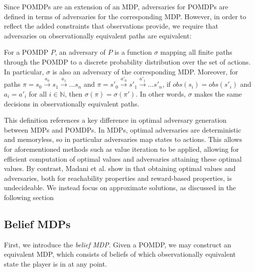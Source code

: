 Since POMDPs are an extension of an MDP, adversaries for POMDPs are defined in terms of adversaries for the corresponding MDP. However, in order to reflect the added constraints that observations provide, we require that adversaries on observationally equivalent paths are equivalent:

\begin{definition}
\label{cs1:pomdp_strats}

For a POMDP $P$, an adversary of $P$ is a function $\sigma$ mapping all finite paths through the POMDP to a discrete probability distribution over the set of actions. In particular, $\sigma$ is also an adversary of the corresponding MDP. Moreover, for paths $\pi = s_0 \xrightarrow{a_0} s_1 \xrightarrow{a_1} \dots s_n$ and $\pi = s'_0 \xrightarrow{a'_0} s'_1 \xrightarrow{a'_1} \dots s'_n$, if $obs(s_i) = obs(s'_i)$ and $a_i = a'_i$ for all $i \in \mathbb{N}$, then $\sigma(\pi) = \sigma(\pi')$. In other words, $\sigma$ makes the same decisions in observationally equivalent paths.

\end{definition}

This definition references a key difference in optimal adversary generation between MDPs and POMDPs. In MDPs, optimal adversaries are deterministic and memoryless, so in particular adversaries map states to actions. This allows for aforementioned methods such as value iteration to be applied, allowing for efficient computation of optimal values and adversaries attaining these optimal values. By contrast, Madani et al. show in \cite{madani_undecidability_2003} that obtaining optimal values and adversaries, both for reachability properties and reward-based properties, is undecideable. We instead focus on approximate solutions, as discussed in the following section

\subsection{Belief MDPs}

First, we introduce the \emph{belief MDP}. Given a POMDP, we may construct an equivalent MDP, which consists of beliefs of which observationally equivalent state the player is in at any point.

